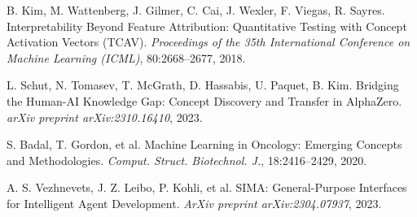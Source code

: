 \documentclass[11pt]{article}
\begin{document}
\begin{thebibliography}{9}
B. Kim, M. Wattenberg, J. Gilmer, C. Cai, J. Wexler, F. Viegas, R. Sayres.
\newblock Interpretability Beyond Feature Attribution: Quantitative Testing with Concept Activation Vectors (TCAV).
\newblock \emph{Proceedings of the 35th International Conference on Machine Learning (ICML)}, 80:2668--2677, 2018.

L. Schut, N. Tomasev, T. McGrath, D. Hassabis, U. Paquet, B. Kim.
\newblock Bridging the Human-AI Knowledge Gap: Concept Discovery and Transfer in AlphaZero.
\newblock \emph{arXiv preprint arXiv:2310.16410}, 2023.

S. Badal, T. Gordon, et al.
\newblock Machine Learning in Oncology: Emerging Concepts and Methodologies.
\newblock \emph{Comput. Struct. Biotechnol. J.}, 18:2416--2429, 2020.

A. S. Vezhnevets, J. Z. Leibo, P. Kohli, et al.
\newblock SIMA: General-Purpose Interfaces for Intelligent Agent Development.
\newblock \emph{ArXiv preprint arXiv:2304.07937}, 2023.

\end{thebibliography}
\end{document}
